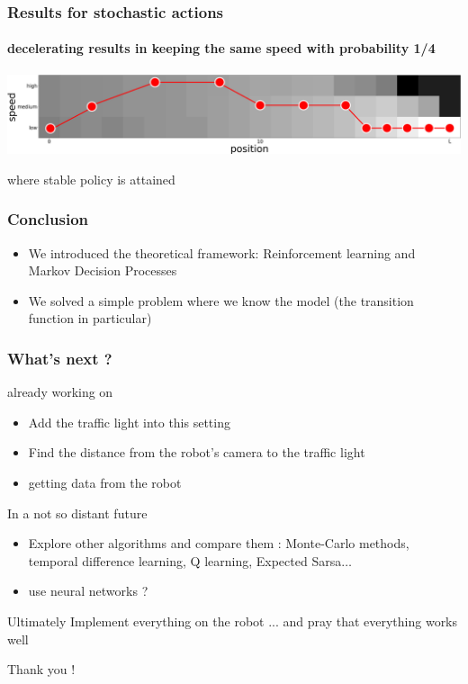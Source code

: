 \documentclass[dvipsnames,svgnames]{beamer}
\begin{document}
\begin{frame}
\frametitle{Results for stochastic actions}
\framesubtitle{decelerating results  in keeping the same speed with probability 1/4}
\centering
\includegraphics[scale=0.12]{img/state_values_sto4_traj.jpg}\\
\begin{block}{}
\centering
where stable policy is attained 
\end{block}
\end{frame}







\begin{frame}
\frametitle{Conclusion }
\begin{block}{}
\begin{itemize}
\item We introduced the theoretical framework: Reinforcement learning and Markov Decision Processes
\item We solved a simple problem where we know the model (the transition function in particular)
\end{itemize}
\end{block}
\end{frame}



\begin{frame}
\frametitle{What's next ? }



\begin{block}{already working on}
\begin{itemize}
\item Add the traffic light into this setting
\item Find the distance from the robot's camera to the traffic light
\item getting data from the robot 
\end{itemize}
\end{block}

\begin{block}{In a not so distant future}
\begin{itemize}
\item Explore other algorithms and compare them : Monte-Carlo methods, temporal difference learning, Q learning, Expected Sarsa$\ldots$
\item use neural networks ?
\end{itemize}
\end{block}

\pause
\begin{block}{Ultimately}
Implement everything on the robot ... \pause and pray that everything works well
\end{block}

\end{frame}

\begin{frame}{}
\centering
\Huge{Thank you !} 
\end{frame}
\end{document}

